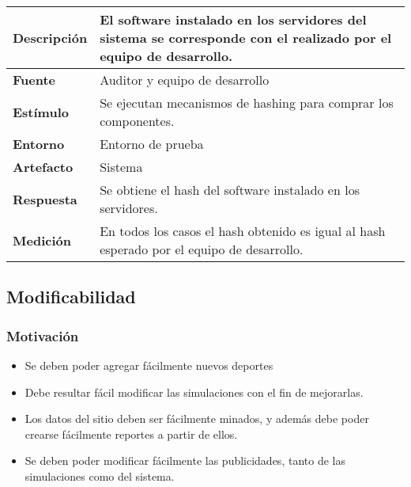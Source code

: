 \begin{center}
  \begin{tabular}{| l | p{10cm} | }
    \hline
	\textbf{Descripción} & El software instalado en los servidores del sistema se corresponde con el realizado por el equipo de desarrollo.\\  \hline
	\textbf{Fuente} & Auditor y equipo de desarrollo\\  \hline
	\textbf{Estímulo} & Se ejecutan mecanismos de hashing para comprar los componentes.\\  \hline
	\textbf{Entorno} & Entorno de prueba\\  \hline
	\textbf{Artefacto} & Sistema\\  \hline
	\textbf{Respuesta} & Se obtiene el hash del software instalado en los servidores.\\  \hline
	\textbf{Medición} & En todos los casos el hash obtenido es igual al hash esperado por el equipo de desarrollo.\\  \hline
  \end{tabular}
\end{center}  




\subsection{Modificabilidad}

\subsubsection*{Motivación}
\begin{itemize}
\item Se deben poder agregar fácilmente nuevos deportes
\item Debe resultar fácil modificar las simulaciones con el fin de mejorarlas.
\item Los datos del sitio deben ser fácilmente minados, y además debe poder crearse fácilmente reportes a partir de ellos.
\item Se deben poder modificar fácilmente las publicidades, tanto de las simulaciones como del sistema.
\end{itemize}

